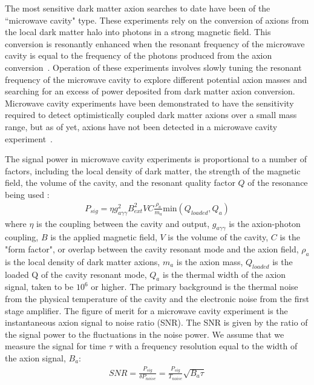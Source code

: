 \documentclass[aps,prl,twocolumn,groupedaddress]{revtex4-1}
\begin{document}
The most sensitive dark matter axion searches to date have been of the ``microwave cavity" type.
These experiments rely on the conversion of axions from the local dark matter halo into photons in a strong magnetic field.
This conversion is resonantly enhanced when the resonant frequency of the microwave cavity is equal to the frequency of the photons produced from the axion conversion~\cite{PhysRevLett.51.1415}.
Operation of these experiments involves slowly tuning the resonant frequency of the microwave cavity to explore different potential axion masses and searching for an excess of power deposited from dark matter axion conversion.
Microwave cavity experiments have been demonstrated to have the sensitivity required to detect optimistically coupled dark matter axions over a small mass range,
but as of yet, axions have not been detected in a microwave cavity experiment~\cite{PhysRevLett.104.041301}.

The signal power in microwave cavity experiments is proportional to a number of factors, including the local density of dark matter, the strength of the magnetic field, the volume of the cavity, and the resonant 
quality factor $Q$ of the resonance being used \cite{TODOCITEEQN}:
\begin{align}
P_{sig} = \eta g_{a\gamma\gamma}^2B_{ext}^2VC\frac{\rho_a}{m_a}\text{min}(Q_{loaded},Q_a)
\end{align}
where $\eta$ is the coupling between the cavity and output, $g_{a\gamma\gamma}$ is the axion-photon coupling, $B$ is the applied magnetic field, $V$ is the volume of the cavity, $C$ is the "form factor", or overlap between the cavity resonant mode and the axion field, $\rho_a$ is the local density of dark matter axions, $m_a$ is the axion mass, $Q_{loaded}$ is the loaded Q of the cavity resonant mode, $Q_a$ is the thermal width of the axion signal, taken to be $10^6$ or higher.
The primary background is the thermal noise from the physical temperature of the cavity and the electronic noise from the first stage amplifier.  
The figure of merit for a microwave cavity experiment is the instantaneous axion signal to noise ratio (SNR).
The SNR is given by the ratio of the signal power to the fluctuations in the noise power. We assume that we measure the signal for time $\tau$ with a frequency resolution equal to the width of the axion signal, $B_a$:
\begin{align}
SNR = \frac{P_{sig}}{\delta P_{noise}} = \frac{P_{sig}}{T_{noise}}\sqrt{B_a \tau}
\end{align}
\end{document}
